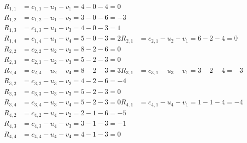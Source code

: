 \[
\begin{aligned}
R_{1,1} &= c_{1,1} - u_{1} - v_{1} = 4 - 0 - 4 = 0 \\
R_{1,2} &= c_{1,2} - u_{1} - v_{2} = 3 - 0 - 6 = -3 \\
R_{1,3} &= c_{1,3} - u_{1} - v_{3} = 4 - 0 - 3 = 1 \\
R_{1,4} &= c_{1,4} - u_{1} - v_{4} = 5 - 0 - 3 = 2 
R_{2,1} &= c_{2,1} - u_{2} - v_{1} = 6 - 2 - 4 = 0 \\
R_{2,2} &= c_{2,2} - u_{2} - v_{2} = 8 - 2 - 6 = 0 \\
R_{2,3} &= c_{2,3} - u_{2} - v_{3} = 5 - 2 - 3 = 0 \\
R_{2,4} &= c_{2,4} - u_{2} - v_{4} = 8 - 2 - 3 = 3 
R_{3,1} &= c_{3,1} - u_{3} - v_{1} = 3 - 2 - 4 = -3 \\
R_{3,2} &= c_{3,2} - u_{3} - v_{2} = 4 - 2 - 6 = -4 \\
R_{3,3} &= c_{3,3} - u_{3} - v_{3} = 5 - 2 - 3 = 0 \\
R_{3,4} &= c_{3,4} - u_{3} - v_{4} = 5 - 2 - 3 = 0 
R_{4,1} &= c_{4,1} - u_{4} - v_{1} = 1 - 1 - 4 = -4 \\
R_{4,2} &= c_{4,2} - u_{4} - v_{2} = 2 - 1 - 6 = -5 \\
R_{4,3} &= c_{4,3} - u_{4} - v_{3} = 3 - 1 - 3 = -1 \\
R_{4,4} &= c_{4,4} - u_{4} - v_{4} = 4 - 1 - 3 = 0 
\end{aligned}
\]

